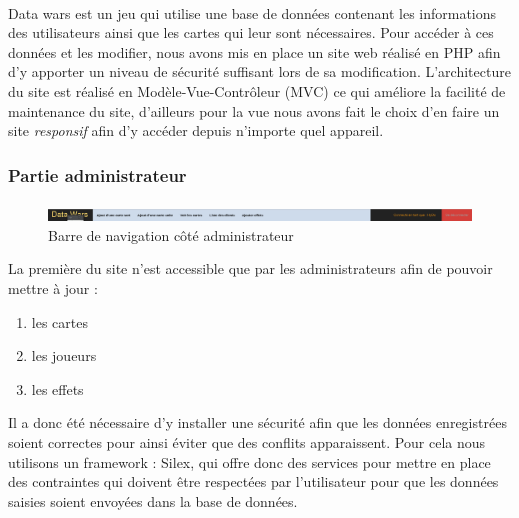 \documentclass[a4paper, titlepage]{livret}
\begin{document}
	\paragraph{}
        Data wars est un jeu qui utilise une base de données contenant les informations des utilisateurs ainsi que les cartes qui leur sont nécessaires. Pour accéder à ces données et les modifier, nous avons mis en place un site web réalisé en PHP afin d'y apporter un niveau de sécurité suffisant lors de sa modification. L'architecture du site est réalisé en Modèle-Vue-Contrôleur (MVC) ce qui améliore la facilité de maintenance du site, d’ailleurs pour la vue nous avons fait le choix d'en faire un site \textit{responsif} afin d'y accéder depuis n'importe quel appareil. 

	\subsubsection{Partie administrateur} 
	\paragraph{}

    	\begin{figure}[th]
      	 \begin{center}
          \includegraphics[scale=0.25]{Assets/navbar_admin.png}
          \caption{Barre de navigation côté administrateur}
          \label{RepTravail}
         \end{center}
        \end{figure}

	 La première du site n'est accessible que par les administrateurs afin de pouvoir mettre à jour : 
	\begin{enumerate}
		\item les cartes
		\item les joueurs
		\item les effets
	\end{enumerate}Il a donc été nécessaire d'y installer une sécurité afin que les données enregistrées soient correctes pour ainsi éviter que des conflits apparaissent. Pour cela nous utilisons un framework : Silex, qui offre donc des services pour mettre en place des contraintes qui doivent être respectées par l'utilisateur pour que les données saisies soient envoyées dans la base de données.
\end{document}
